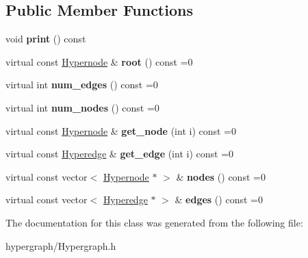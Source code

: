 \subsection*{Public Member Functions}
\begin{DoxyCompactItemize}
\item 
\hypertarget{classScarab_1_1Hypergraph_a26857271e0105d11fc4bfedef1cead82}{
void {\bfseries print} () const }
\label{classScarab_1_1Hypergraph_a26857271e0105d11fc4bfedef1cead82}

\item 
\hypertarget{classScarab_1_1Hypergraph_a2eea78b2ed202df0eab0fddd8f59509f}{
virtual const \hyperlink{classScarab_1_1Hypernode}{Hypernode} \& {\bfseries root} () const =0}
\label{classScarab_1_1Hypergraph_a2eea78b2ed202df0eab0fddd8f59509f}

\item 
\hypertarget{classScarab_1_1Hypergraph_a9324b67948bc27e39d2ae290e1f092c8}{
virtual int {\bfseries num\_\-edges} () const =0}
\label{classScarab_1_1Hypergraph_a9324b67948bc27e39d2ae290e1f092c8}

\item 
\hypertarget{classScarab_1_1Hypergraph_ae12ab2f2879a4c5c21cebb81e42e660e}{
virtual int {\bfseries num\_\-nodes} () const =0}
\label{classScarab_1_1Hypergraph_ae12ab2f2879a4c5c21cebb81e42e660e}

\item 
\hypertarget{classScarab_1_1Hypergraph_a28de9b9a1a650ec542989922e342c5cc}{
virtual const \hyperlink{classScarab_1_1Hypernode}{Hypernode} \& {\bfseries get\_\-node} (int i) const =0}
\label{classScarab_1_1Hypergraph_a28de9b9a1a650ec542989922e342c5cc}

\item 
\hypertarget{classScarab_1_1Hypergraph_a63fa1d963987ea5809cc94f6f64bbd3b}{
virtual const \hyperlink{classScarab_1_1Hyperedge}{Hyperedge} \& {\bfseries get\_\-edge} (int i) const =0}
\label{classScarab_1_1Hypergraph_a63fa1d963987ea5809cc94f6f64bbd3b}

\item 
\hypertarget{classScarab_1_1Hypergraph_aef5f17093ba8a04b7dcacf4cfa6cf4aa}{
virtual const vector$<$ \hyperlink{classScarab_1_1Hypernode}{Hypernode} $\ast$ $>$ \& {\bfseries nodes} () const =0}
\label{classScarab_1_1Hypergraph_aef5f17093ba8a04b7dcacf4cfa6cf4aa}

\item 
\hypertarget{classScarab_1_1Hypergraph_aadbcb0c396ed2b80cefddd63091b34b7}{
virtual const vector$<$ \hyperlink{classScarab_1_1Hyperedge}{Hyperedge} $\ast$ $>$ \& {\bfseries edges} () const =0}
\label{classScarab_1_1Hypergraph_aadbcb0c396ed2b80cefddd63091b34b7}

\end{DoxyCompactItemize}


The documentation for this class was generated from the following file:\begin{DoxyCompactItemize}
\item 
hypergraph/Hypergraph.h\end{DoxyCompactItemize}
